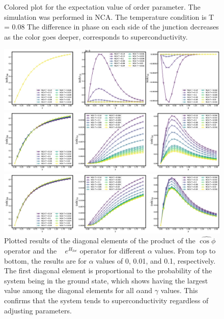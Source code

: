 \documentclass{article}[12pt]
\begin{document}
\begin{spacing}{1.3}
\begin{figure}[H]
  \caption{Colored plot for the expectation value of order parameter. The simulation was performed in NCA. The temperature condition is T = 0.08
  The difference in phase on each side of the junction decreases as the color goes deeper, corresponds to superconductivity.}
  \vfill
\end{figure}
\pagebreak
\begin{figure}[htbp]
  \centerline{\includegraphics[width=15cm]{TexFigure/4/4_3_03_Matele_Ns3_alp0.png}}
  \centerline{\includegraphics[width=15cm]{TexFigure/4/4_3_04_Matele_Ns3_alp0_1.png}}
  \centerline{\includegraphics[width=15cm]{TexFigure/4/4_3_05_Matele_Ns3_alp1.png}}
  \caption{Plotted results of the diagonal elements of the product of the $\hat{\cos\phi}$ operator and the  
  $e^{H_{loc}}$ operator for different $\alpha$ values. From top to bottom, the results are for $\alpha$ 
  values of 0, 0.01, and 0.1, respectively. The first diagonal element is proportional to the probability of 
  the system being in the ground state, which shows having the largest value among the diagonal elements 
  for all $\alpha $and $\gamma$ values. This confirms that the system tends to superconductivity regardless of 
  adjusting parameters.}
  \end{figure}
\pagebreak

\end{spacing}
\end{document}
